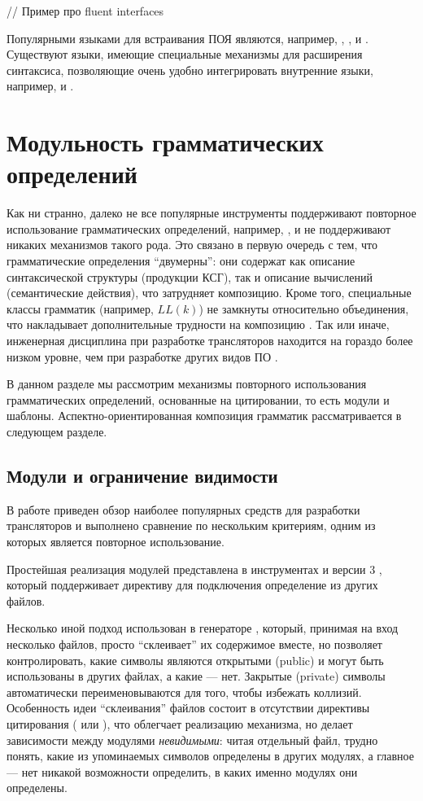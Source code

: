 // Пример про fluent interfaces

Популярными языками для встраивания ПОЯ являются, например,  \cite{???},  \cite{???},  \cite{???} и  \cite{???}. Существуют языки, имеющие специальные механизмы для расширения синтаксиса, позволяющие очень удобно интегрировать внутренние языки, например,  \cite{???} и  \cite{???}.
		
\section{Модульность грамматических определений}

Как ни странно, далеко не все популярные инструменты поддерживают повторное использование грамматических определений, например,  \cite{???},  \cite{???} и  \cite{???} не поддерживают никаких механизмов такого рода. Это связано в первую очередь с тем, что грамматические определения ``двумерны'': они содержат как описание синтаксической структуры (продукции КСГ), так и описание вычислений (семантические действия), что затрудняет композицию. Кроме того, специальные классы грамматик (например, $LL(k)$) не замкнуты относительно объединения, что накладывает дополнительные трудности на композицию \cite{???}. Так или иначе, инженерная дисциплина при разработке трансляторов находится на гораздо более низком уровне, чем при разработке других видов ПО \cite{Grammarware}.

В данном разделе мы рассмотрим механизмы повторного использования грамматических определений, основанные на цитировании, то есть модули и шаблоны. Аспектно-ориентированная композиция грамматик рассматривается в следующем разделе.

\subsection{Модули и ограничение видимости} В работе \cite{SysProg-2006} приведен обзор наиболее популярных средств для разработки трансляторов и выполнено сравнение по нескольким критериям, одним из которых является повторное использование.

Простейшая реализация модулей представлена в инструментах  \cite{???} и  версии 3 \cite{???}, который поддерживает директиву  для подключения определение из других файлов. 

Несколько иной подход использован в генераторе  \cite{???}, который, принимая на вход несколько файлов, просто ``склеивает'' их содержимое вместе, но позволяет контролировать, какие символы являются открытыми (public) и могут быть использованы в других файлах, а какие --- нет. Закрытые (private) символы автоматически переименовываются для того, чтобы избежать коллизий. Особенность идеи ``склеивания'' файлов состоит в отсутствии директивы цитирования ( или ), что облегчает реализацию механизма, но делает зависимости между модулями \emph{невидимыми}: читая отдельный файл, трудно понять, какие из упоминаемых символов определены в других модулях, а главное --- нет никакой возможности определить, в каких именно модулях они определены.

